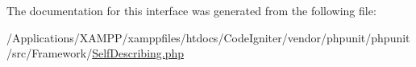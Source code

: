 The documentation for this interface was generated from the following file\+:\begin{DoxyCompactItemize}
\item 
/\+Applications/\+X\+A\+M\+P\+P/xamppfiles/htdocs/\+Code\+Igniter/vendor/phpunit/phpunit/src/\+Framework/\mbox{\hyperlink{_self_describing_8php}{Self\+Describing.\+php}}\end{DoxyCompactItemize}
